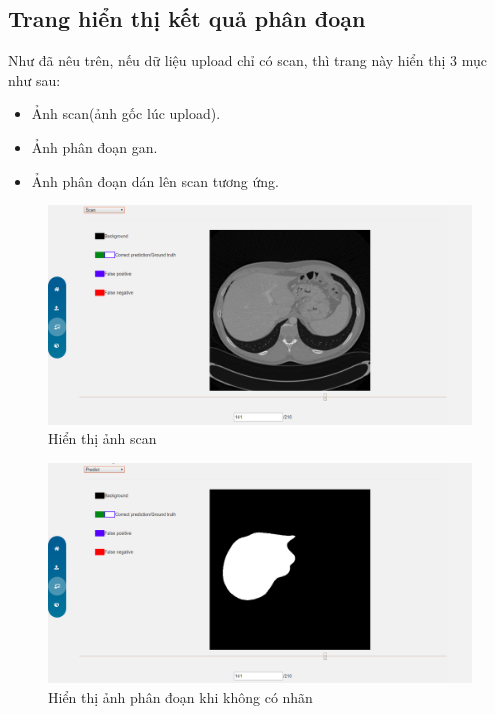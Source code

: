 \subsection{Trang hiển thị kết quả phân đoạn}
Như đã nêu trên, nếu dữ liệu upload chỉ có scan, thì trang này hiển thị 3 mục như sau:
\begin{itemize}
    \item Ảnh scan(ảnh gốc lúc upload).
    \item Ảnh phân đoạn gan.
    \item Ảnh phân đoạn dán lên scan tương ứng.
\end{itemize}

\begin{figure}[h]
\centering
    \includegraphics[totalheight=7cm]{Images/app_scan.png}
    \caption{Hiển thị ảnh scan}
    \label{skip_conn}
\end{figure}
\begin{figure}[h]
\centering
    \includegraphics[totalheight=7cm]{Images/app_label.png}
    \caption{Hiển thị ảnh phân đoạn khi không có nhãn}
    \label{skip_conn}
\end{figure}
